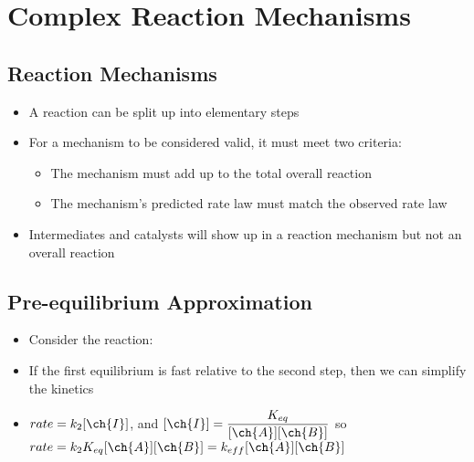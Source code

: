 \documentclass[12pt, openany, letterpaper]{memoir}
\begin{document}
\chapter{Complex Reaction Mechanisms}
\section*{Reaction Mechanisms}
\begin{itemize}
	\item A reaction can be split up into elementary steps
	\item For a mechanism to be considered valid, it must meet two criteria:
	\begin{itemize}
		\item The mechanism must add up to the total overall reaction
		\item The mechanism's predicted rate law must match the observed rate law
	\end{itemize}
	\item Intermediates and catalysts will show up in a reaction mechanism but not an overall reaction
\end{itemize}
\section*{Pre-equilibrium Approximation}
\begin{itemize}
	\item Consider the reaction: 
	\item If the first equilibrium is fast relative to the second step, then we can simplify the kinetics
	\item $rate = k_2[\ch{I}]$, and $[\ch{I}] = \dfrac{K_{eq}}{[\ch{A}][\ch{B}]}$ so $rate = k_2K_{eq}[\ch{A}][\ch{B}] = k_{eff}[\ch{A}][\ch{B}]$
\end{itemize}
\end{document}
